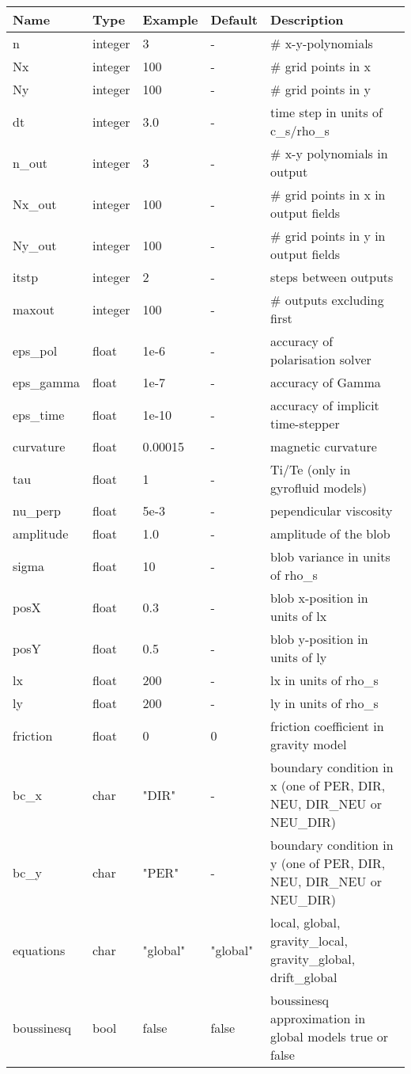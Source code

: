 \documentclass{hitec}
\begin{document}
\begin{longtable}{llll>{\RaggedRight}p{7cm}}
\toprule
\rowcolor{gray!50}\textbf{Name} &  \textbf{Type} & \textbf{Example} & \textbf{Default} & \textbf{Description}  \\ \midrule
n      & integer & 3 & - &\# x-y-polynomials \\
Nx     & integer &100& - &\# grid points in x \\
Ny     & integer &100& - &\# grid points in y \\
dt     & integer &3.0& - &time step in units of c\_s/rho\_s \\
n\_out  & integer &3  & - &\# x-y polynomials in output \\
Nx\_out & integer &100& - &\# grid points in x in output fields \\
Ny\_out & integer &100& - &\# grid points in y in output fields \\
itstp  & integer &2  & - &   steps between outputs \\
maxout & integer &100& - &      \# outputs excluding first \\
eps\_pol   & float &1e-6    & - &  accuracy of polarisation solver \\
eps\_gamma & float &1e-7    & - & accuracy of Gamma  \\
eps\_time  & float &1e-10   & - & accuracy of implicit time-stepper \\
curvature  & float &0.00015& - & magnetic curvature \\
tau        & float &1      & - & Ti/Te (only in gyrofluid models) \\
nu\_perp    & float &5e-3   & - & pependicular viscosity \\
amplitude  & float &1.0    & - & amplitude of the blob \\
sigma      & float &10     & - & blob variance in units of rho\_s \\
posX       & float &0.3    & - & blob x-position in units of lx \\
posY       & float &0.5    & - & blob y-position in units of ly \\
lx         & float &200    & - & lx in units of rho\_s \\
ly         & float &200    & - & ly in units of rho\_s \\
friction   & float & 0     & 0 & friction coefficient in gravity model \\
bc\_x   & char & "DIR"      & - & boundary condition in x (one of PER, DIR, NEU, DIR\_NEU or NEU\_DIR) \\
bc\_y   & char & "PER"      & - & boundary condition in y (one of PER, DIR, NEU, DIR\_NEU or NEU\_DIR) \\
equations  & char & "global" & "global" &local, global, gravity\_local, gravity\_global, drift\_global \\
boussinesq & bool & false    & false &boussinesq approximation in global models true or false\\
\bottomrule
\end{longtable}
\end{document}
